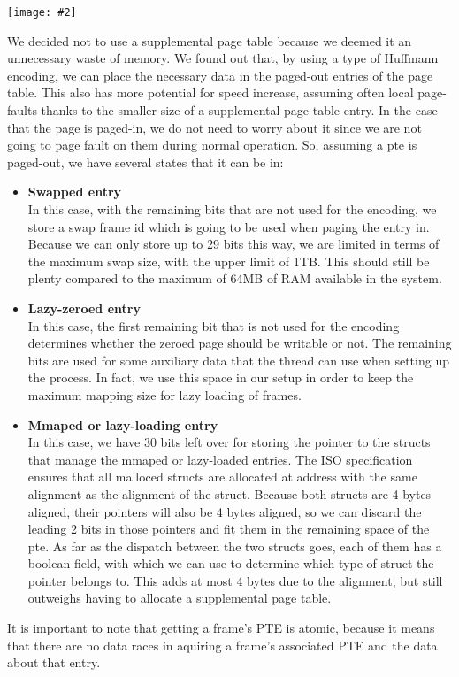 \documentclass{report}
\newcommand{\bullpara}[2]{\item \textbf{#1} \ #2}
\newcommand{\centerimage}[2]{\begin{center}
	\texttt{[image: \#2]}
\end{center}}
\newcommand{\compitem}[1]{\begin{itemize}\setlength\itemsep{-0.5em}#1\end{itemize}}
\begin{document}
				\centerimage{width=\textwidth}{page table entry.png}
				We decided not to use a supplemental page table because we deemed
				it an unnecessary waste of memory. We found out that, by using a 
				type of Huffmann encoding, we can place the necessary data in 
				the paged-out entries of the page table. This also has more 
				potential for speed increase, assuming often local page-faults 
				thanks to the smaller size of a supplemental page table entry. 
				In the case that the page is paged-in, we do not need to worry
				about it since we are not going to page fault on them during
				normal operation. So, assuming a pte is paged-out, we have
				several states that it can be in:
				\compitem{
					\bullpara{Swapped entry}
						{\\In this case, with the remaining bits that are not used for the encoding,
						we store a swap frame id which is going to be used when paging
						the entry in. Because we can only store up to 29 bits this
						way, we are limited in terms of the maximum swap size, with the upper limit of 1TB.
						This should still be plenty compared to the maximum of 64MB
						of RAM available in the system.}
					\bullpara{Lazy-zeroed entry}
						{\\In this case, the first remaining bit that is not used for the encoding
						determines whether the zeroed page should be
						writable or not. The remaining bits are used for some auxiliary
						data that the thread can use when setting up the process.
						In fact, we use this space in our setup in order to keep the
						maximum mapping size for lazy loading of frames.}
					\bullpara{Mmaped or lazy-loading entry}
						{\\ In this case, we have 30 bits left over for storing the
						pointer to the structs that manage the mmaped or lazy-loaded
						entries. The ISO specification ensures that all malloced structs are
						allocated at address with the same alignment as the alignment of the struct.
						Because both structs are 4 bytes aligned, their pointers will also be 4 bytes aligned,
						so we can discard the leading 2 bits in those pointers and fit them in
						the remaining space of the pte. As far as the dispatch between the
						two structs goes, each of them has a boolean field, 
						with which we can use to determine which type of struct the pointer belongs to.
						This adds at most 4 bytes due to the alignment, but
						still outweighs having to allocate a supplemental page table.}
				}

				It is important to note that getting a frame's PTE is atomic, because it means that
				there are no data races in aquiring a frame's associated PTE and the data about that entry.
				
\end{document}
